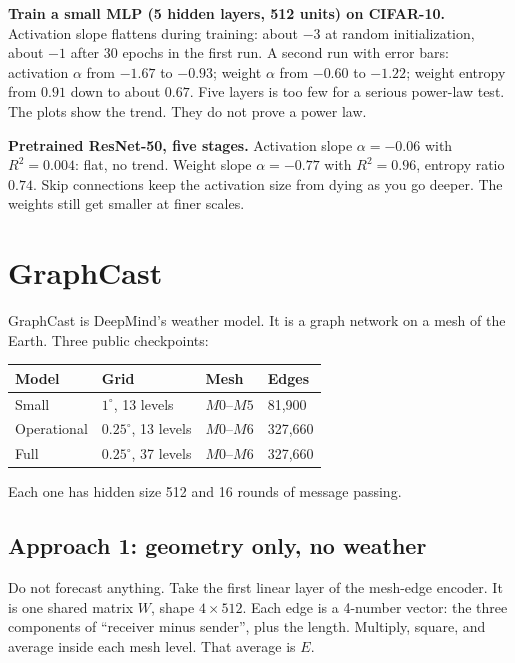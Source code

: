 \documentclass[11pt,a4paper]{article}
\begin{document}
\textbf{Train a small MLP (5 hidden layers, 512 units) on CIFAR-10.}
Activation slope flattens during training: about \(-3\) at random initialization, about \(-1\) after 30 epochs in the first run.
A second run with error bars: activation \(\alpha\) from \(-1.67\) to \(-0.93\); weight \(\alpha\) from \(-0.60\) to \(-1.22\); weight entropy from \(0.91\) down to about \(0.67\).
Five layers is too few for a serious power-law test. The plots show the trend. They do not prove a power law.

\textbf{Pretrained ResNet-50, five stages.}
Activation slope \(\alpha = -0.06\) with \(R^2 = 0.004\): flat, no trend.
Weight slope \(\alpha = -0.77\) with \(R^2 = 0.96\), entropy ratio \(0.74\).
Skip connections keep the activation size from dying as you go deeper. The weights still get smaller at finer scales.

\section*{GraphCast}

GraphCast is DeepMind's weather model. It is a graph network on a mesh of the Earth.
Three public checkpoints:

\begin{center}
\small
\begin{tabular}{llll}
\toprule
Model & Grid & Mesh & Edges \\
\midrule
Small & \(1^\circ\), 13 levels & \(M0\)--\(M5\) & 81{,}900 \\
Operational & \(0.25^\circ\), 13 levels & \(M0\)--\(M6\) & 327{,}660 \\
Full & \(0.25^\circ\), 37 levels & \(M0\)--\(M6\) & 327{,}660 \\
\bottomrule
\end{tabular}
\end{center}

Each one has hidden size 512 and 16 rounds of message passing.

\subsection*{Approach 1: geometry only, no weather}

Do not forecast anything.
Take the first linear layer of the mesh-edge encoder. It is one shared matrix \(W\), shape \(4 \times 512\).
Each edge is a 4-number vector: the three components of ``receiver minus sender'', plus the length.
Multiply, square, and average inside each mesh level. That average is \(E\).
\end{document}
